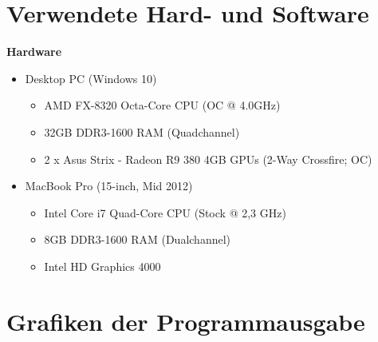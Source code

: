 \documentclass[
	12pt,
	a4paper,
	BCOR10mm,
	DIV14,
	headsepline,
	usegeometry,
]{scrreprt}
\begin{document}
\chapter{Verwendete Hard- und Software}
\textbf{Hardware}
\begin{itemize}
	\item Desktop PC (Windows 10)
	\begin{itemize}
		\item AMD FX-8320 Octa-Core CPU (OC @ 4.0GHz)
		\item 32GB DDR3-1600 RAM (Quadchannel)
		\item 2 x Asus Strix - Radeon R9 380 4GB GPUs (2-Way Crossfire; OC)
	\end{itemize}
	\item MacBook Pro (15-inch, Mid 2012)
	\begin{itemize}
		\item Intel Core i7 Quad-Core CPU (Stock @ 2,3 GHz)
		\item 8GB DDR3-1600 RAM (Dualchannel)
		\item Intel HD Graphics 4000
	\end{itemize}
\end{itemize}

\chapter{Grafiken der Programmausgabe}
\end{document}
